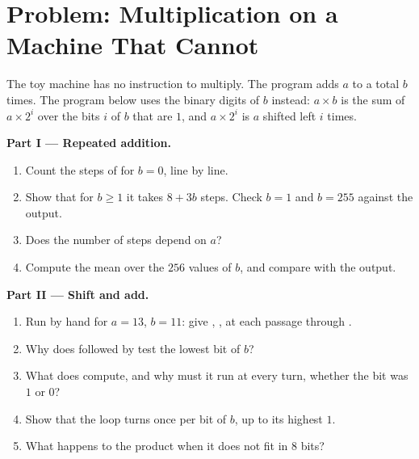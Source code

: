 \section{Problem: Multiplication on a Machine That Cannot}\label{sec:g11:von-neumann-machine:problem}

\begin{problem}\label{pb:g11:von-neumann-machine:1}
The toy machine has no instruction to multiply. The program  adds $a$ to a total $b$ times. The
program below uses the binary digits of $b$ instead: $a \times b$ is the sum of $a \times 2^i$ over the bits $i$ of
$b$ that are $1$, and $a \times 2^i$ is $a$ shifted left $i$ times.

\label{lst:g11:von-neumann-machine:shift-multiply}

\label{lst:g11:von-neumann-machine:step-counts}

\label{out:g11:von-neumann-machine:step-counts}

\medskip\noindent\textbf{Part I --- Repeated addition.}
\begin{enumerate}
  \item Count the steps of  for $b = 0$, line by line.
  \item Show that for $b \ge 1$ it takes $8 + 3b$ steps. Check $b = 1$ and $b = 255$ against the output.
  \item Does the number of steps depend on $a$?
  \item Compute the mean over the $256$ values of $b$, and compare with the output.
\end{enumerate}

\medskip\noindent\textbf{Part II --- Shift and add.}
\begin{enumerate}[resume]
  \item Run  by hand for $a = 13$, $b = 11$: give , ,  at each
    passage through .
  \item Why does  followed by  test the lowest bit of $b$?
  \item What does  compute, and why must it run at every turn, whether the bit was $1$ or $0$?
  \item Show that the loop turns once per bit of $b$, up to its highest $1$.
  \item What happens to the product when it does not fit in $8$ bits?
\end{enumerate}


\end{problem}

